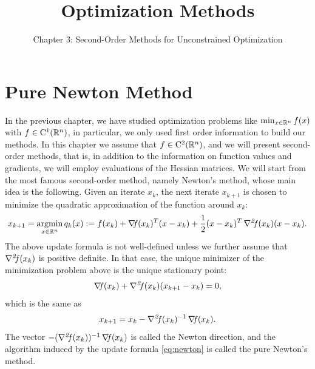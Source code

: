 \documentclass[10pt,a4paper]{article}
\title{Optimization Methods}
\author{Chapter 3: Second-Order Methods for Unconstrained Optimization}
\date{}
\begin{document}
	\maketitle
	\section{Pure Newton Method}
	In the previous chapter, we have studied optimization problems like $\min_{x\in\mathbb{R}^n} f(x)$ with $f\in\mathord{\mathrm{C^1}}(\mathbb{R}^n)$, in particular, we only used first order information to build our methods. In this chapter we assume that $f\in\mathord{\mathrm{C^2}}(\mathbb{R}^n)$, and we will present second-order methods, that is, in addition to the information on function values and gradients, we will employ evaluations of the Hessian matrices. We will start from the most famous second-order method, namely Newton's method, whose main idea is the following. Given an iterate $x_k$, the next iterate $x_{k+1}$ is chosen to minimize the quadratic approximation of the function around $x_k$:
	\begin{equation*}
		x_{k+1} = \operatorname*{argmin}_{x \in \mathbb{R}^n} q_k(x):= f(x_k) + \operatorname*{\mathit{\nabla \!f}}(x_k)^T (x - x_k) + \frac{1}{2}(x - x_k)^T \operatorname*{\mathit{\nabla^2 \!f}}(x_k)(x - x_k).
	\end{equation*}
	The above update formula is not well-defined unless we further assume that $\operatorname*{\mathit{\nabla^2 \!f}}(x_k)$ is positive definite. In that case, the unique minimizer of the minimization problem above is the unique stationary point:
	\begin{equation*}
		\operatorname*{\mathit{\nabla \!f}}(x_k) + \operatorname*{\mathit{\nabla^2 \!f}}(x_k)(x_{k+1} - x_k) = 0,
	\end{equation*}
	which is the same as
	\begin{equation}\label{eq:newton}
		x_{k+1} = x_k - \operatorname*{\mathit{\nabla^2 \!f}}(x_k)^{-1} \operatorname*{\mathit{\nabla \!f}}(x_k).
	\end{equation}
	The vector $-(\operatorname*{\mathit{\nabla^2 \!f}}(x_k))^{-1} \operatorname*{\mathit{\nabla \!f}}(x_k)$ is called the Newton direction, and the algorithm induced by the update formula \eqref{eq:newton} is called the pure Newton's method. 
	
\end{document}
